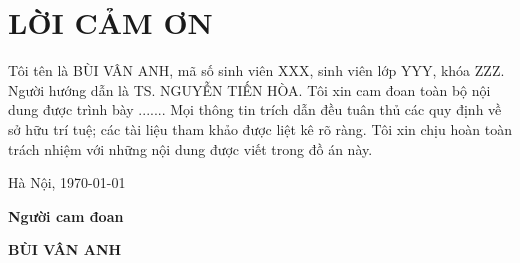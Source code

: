 \section*{LỜI CẢM ƠN}
\thispagestyle{empty}
Tôi tên là BÙI VÂN ANH, mã số sinh viên XXX, sinh viên lớp YYY, khóa ZZZ. Người hướng dẫn là TS. NGUYỄN TIẾN HÒA. Tôi xin cam đoan toàn bộ nội dung được trình bày ....... Mọi thông tin trích dẫn đều tuân thủ các quy định về sở hữu trí tuệ; các tài liệu tham khảo được liệt kê rõ ràng. Tôi xin chịu hoàn toàn trách nhiệm với những nội dung được viết trong đồ án này.

\vspace{6pt}
\hspace{8.3cm}Hà Nội, \today

\hspace{9cm}\textbf{Người cam đoan}

\vspace{2cm}
\hspace{9.25cm}\textbf{BÙI VÂN ANH}
\cleardoublepage